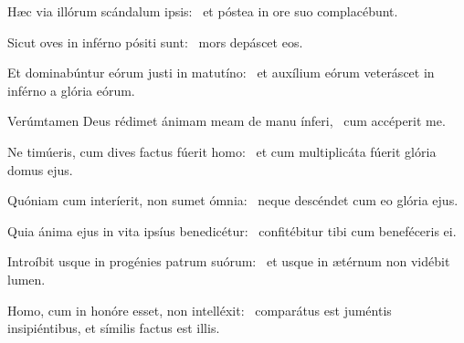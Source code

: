 
\item Hæc via illórum scándalum ipsis:~\psstar{} et póstea in ore suo complacébunt.

\item Sicut oves in inférno pósiti sunt:~\psstar{} mors depáscet eos.

\item Et dominabúntur eórum justi in matutíno:~\psstar{} et auxílium eórum veteráscet in inférno a glória eórum.

\item Verúmtamen Deus rédimet ánimam meam de manu ínferi,~\psstar{} cum accéperit me.

\item Ne timúeris, cum dives factus fúerit homo:~\psstar{} et cum multiplicáta fúerit glória domus ejus.

\item Quóniam cum interíerit, non sumet ómnia:~\psstar{} neque descéndet cum eo glória ejus.

\item Quia ánima ejus in vita ipsíus benedicétur:~\psstar{} confitébitur tibi cum beneféceris ei.

\item Introíbit usque in progénies patrum suórum:~\psstar{} et usque in ætérnum non vidébit lumen.

\item Homo, cum in honóre esset, non intelléxit:~\psstar{} comparátus est juméntis insipiéntibus, et símilis factus est illis.